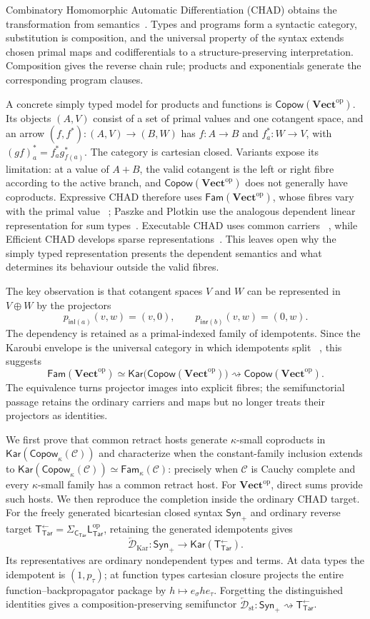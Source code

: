 \documentclass[runningheads,envcountsame]{llncs}
\newcommand{\Vectop}{\mathbf{Vect}^{\mathrm{op}}}
\newcommand{\Synp}{\mathsf{Syn}_{+}}
\newcommand{\Tar}{\mathsf{Tar}}
\newcommand{\CTar}{\mathsf C_{\Tar}}
\newcommand{\LTar}{\mathsf L_{\Tar}}
\newcommand{\TotTar}{\mathsf T_{\Tar}^{\leftarrow}}
\newcommand{\Copow}{\mathsf{Copow}}
\newcommand{\Fam}{\mathsf{Fam}}
\newcommand{\Kar}{\mathsf{Kar}}
\newcommand{\DKar}{\overleftarrow{\mathcal D}_{\mathrm{Kar}}}
\newcommand{\Dst}{\overleftarrow{\mathcal D}_{\mathrm{st}}}
\newcommand{\semiarrow}{\rightsquigarrow}
\begin{document}
Combinatory Homomorphic Automatic Differentiation (CHAD) obtains the
transformation from semantics~\cite{Vakar2021,VakarSmeding2022,LucatelliNunesVakar2023}.
Types and programs form a syntactic category, substitution is composition, and
the universal property of the syntax extends chosen primal maps and
codifferentials to a structure-preserving interpretation. Composition gives the
reverse chain rule; products and exponentials generate the corresponding
program clauses.

A concrete simply typed model for products and functions is
$\Copow(\Vectop)$. Its objects $(A,V)$ consist of a set of primal values and one
cotangent space, and an arrow $(f,f^*):(A,V)\to(B,W)$ has $f:A\to B$ and
$f_a^*:W\to V$, with $(gf)^*_a=f_a^*g^*_{f(a)}$. The category is cartesian
closed. Variants expose its limitation: at a value of $A+B$, the valid
cotangent is the left or right fibre according to the active branch, and
$\Copow(\Vectop)$ does not generally have coproducts. Expressive CHAD therefore
uses $\Fam(\Vectop)$, whose fibres vary with the primal value
~\cite{LucatelliNunesVakar2023}; Paszke and Plotkin use the analogous dependent
linear representation for sum types~\cite{PaszkePlotkin2023}. Executable CHAD uses common carriers
~\cite[Section~15.2 and Appendix~C]{LucatelliNunesVakar2023}, while Efficient
CHAD develops sparse representations~\cite{SmedingVakar2024}. This leaves open
why the simply typed representation presents the dependent semantics and what
determines its behaviour outside the valid fibres.

The key observation is that cotangent spaces $V$ and $W$ can be represented in
$V\oplus W$ by the projectors
$$
p_{\mathsf{inl}(a)}(v,w)=(v,0),
\qquad
p_{\mathsf{inr}(b)}(v,w)=(0,w).
$$
The dependency is retained as a primal-indexed family of idempotents. Since the
Karoubi envelope is the universal category in which idempotents split
~\cite{BorceuxDejean1986,Kelly1982,MacLane1998}, this suggests
$$
\Fam(\Vectop)
\simeq
\Kar\bigl(\Copow(\Vectop)\bigr)
\semiarrow
\Copow(\Vectop).
$$
The equivalence turns projector images into explicit fibres; the semifunctorial
passage retains the ordinary carriers and maps but no longer treats their
projectors as identities.

We first prove that common retract hosts generate $\kappa$-small coproducts in
$\Kar(\Copow_\kappa(\mathcal C))$ and characterize when the constant-family
inclusion extends to
$\Kar(\Copow_\kappa(\mathcal C))\simeq\Fam_\kappa(\mathcal C)$: precisely when
$\mathcal C$ is Cauchy complete and every $\kappa$-small family has a common
retract host. For $\Vectop$, direct sums provide such hosts. We then reproduce
the completion inside the ordinary CHAD target. For the freely generated
bicartesian closed syntax $\Synp$ and ordinary reverse target
$\TotTar=\Sigma_{\CTar}\LTar^{\mathrm{op}}$, retaining the generated
idempotents gives
$$
\DKar:\Synp\longrightarrow\Kar(\TotTar).
$$
Its representatives are ordinary nondependent types and terms. At data types
the idempotent is $(1,p_\tau)$; at function types cartesian closure projects the
entire function--backpropagator package by $h\mapsto e_\sigma h e_\tau$.
Forgetting the distinguished identities gives a composition-preserving
semifunctor $\Dst:\Synp\semiarrow\TotTar$.
\end{document}
